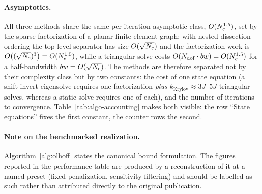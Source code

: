 \paragraph{Asymptotics.}
All three methods share the same per-iteration asymptotic class,
$O(N_e^{1.5})$, set by the sparse factorization of a planar finite-element
graph: with nested-dissection ordering the top-level separator has size
$O(\sqrt{N_e})$ and the factorization work is
$O\bigl((\sqrt{N_e})^3\bigr) = O(N_e^{1.5})$, while a triangular solve costs
$O(N_{\mathrm{dof}} \cdot bw) = O(N_e^{1.5})$ for a half-bandwidth
$bw = O(\sqrt{N_e})$.  The methods are therefore separated not by their
complexity class but by two constants: the cost of one state equation
(a shift-invert eigensolve requires one factorization \emph{plus}
$k_{\mathrm{Krylov}} \approx 3J$--$5J$ triangular solves, whereas a static
solve requires one of each), and the number of iterations to convergence.
Table~\ref{tab:algo-accounting} makes both visible: the row
``State equations'' fixes the first constant, the counter rows the second.

\paragraph{Note on the benchmarked realization.}
Algorithm~\ref{alg:olhoff} states the canonical bound formulation.  The
figures reported in the performance table are produced by a reconstruction of
it at a named preset (fixed penalization, sensitivity filtering) and should
be labelled as such rather than attributed directly to the original
publication.
